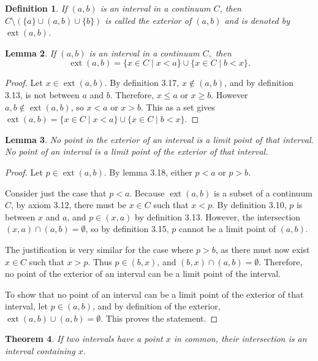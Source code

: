 \documentclass{amsart}
\newtheorem{theorem}{Theorem}
\newtheorem{lemma}[theorem]{Lemma}
\newtheorem{definition}[theorem]{Definition}
\newcommand{\1}{\mathds{1}}
\DeclareMathOperator{\ext}{ext}
\numberwithin{equation}{section}
\numberwithin{theorem}{section}
\begin{document}
\begin{definition}
	If $(a,b)$ is an interval in a continuum $C$, then $C \setminus (\{a\} \cup (a,b) \cup \{b\})$ is called the \emph{exterior} of $(a,b)$ and is denoted by $\ext{(a,b)}$.
\end{definition}


\begin{lemma}
	If $(a,b)$ is an interval in a continuum $C,$ then
	\[
	\ext{(a,b)}=\{x\in C\mid x<a\}\cup\{x\in C\mid b<x\}.
	\]
\end{lemma}

\begin{proof}
	Let $x\in \ext{(a,b)}$. By definition 3.17, $x\notin (a,b)$, and by definition 3.13, is not between $a$ and $b$. Therefore, $x\leq a$ or $x\geq b$. However $a,b\notin \ext{(a,b)}$, so $x<a$ or $x>b$. This as a set gives $\ext{(a,b)}=\{x\in C\mid x<a\}\cup\{x\in C\mid b<x\}$.
\end{proof}

\begin{lemma}  No point in the exterior of an interval is a limit point of that interval.  No point of an interval is a limit point of the exterior of that interval.
\end{lemma}

\begin{proof}
	Let $p\in \ext{(a,b)}$. By lemma 3.18, either $p<a$ or $p>b$. 
	
	Consider just the case that $p<a$. Because $\ext{(a,b)}$ is a subset of a continuum $C$, by axiom 3.12, there must be $x\in C$ such that $x<p$. By definition 3.10, $p$ is between $x$ and $a$, and $p\in (x,a)$ by definition 3.13. However, the intersection $(x,a)\cap (a,b)=\emptyset$, so by definition 3.15, $p$ cannot be a limit point of $(a,b)$. 
	
	The justification is very similar for the case where $p>b$, as there must now exist $x\in C$ such that $x>p$. Thus $p\in(b,x)$, and $(b,x)\cap (a,b)=\emptyset$. Therefore, no point of the exterior of an interval can be a limit point of the interval. 
	
	To show that no point of an interval can be a limit point of the exterior of that interval, let $p\in (a,b)$, and by definition of the exterior, $\ext{(a,b)}\cup (a,b) = \emptyset$. This proves the statement.
\end{proof}

\begin{theorem}
	If two intervals have a point $x$ in common, their intersection is an interval containing $x$.
\end{theorem}
\end{document}
